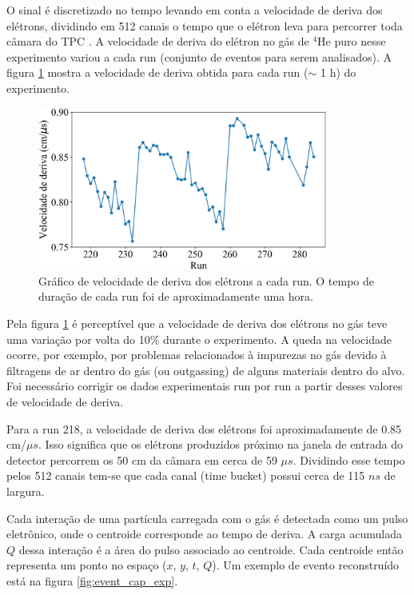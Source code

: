 \documentclass[a4paper,12pt,oneside]{book}
\begin{document}
\par O sinal é discretizado no tempo levando em conta a velocidade de deriva dos elétrons, dividindo em 512 canais o tempo que o elétron leva para percorrer toda câmara do TPC \cite{josh_bradt, pattpc}. A velocidade de deriva do elétron no gás de $^4$He puro nesse experimento variou a cada run (conjunto de eventos para serem analisados). A figura \ref{fig:vdrif_vs_run} mostra a velocidade de deriva obtida para cada run ($\sim$ 1 h) do experimento.

\begin{figure}[H]
    \centering
    \includegraphics[width=0.85\textwidth]{figs/vdrift_vs_run.png}
    \caption{Gráfico de velocidade de deriva dos elétrons a cada run. O tempo de duração de cada run foi de aproximadamente uma hora.}
    \label{fig:vdrif_vs_run}
\end{figure}

\par Pela figura \ref{fig:vdrif_vs_run} é perceptível que a velocidade de deriva dos elétrons no gás teve uma variação por volta do 10\% durante o experimento. A queda na velocidade ocorre, por exemplo, por problemas relacionados à impurezas no gás devido à filtragens de ar dentro do gás (ou outgassing) de alguns materiais dentro do alvo. Foi necessário corrigir os dados experimentais run por run a partir desses valores de velocidade de deriva.

\par Para a run 218, a velocidade de deriva dos elétrons foi aproximadamente de 0.85 cm/$\mu s$. Isso significa que os elétrons produzidos próximo na janela de entrada do detector percorrem os 50 cm da câmara em cerca de 59 $\mu s$. Dividindo esse tempo pelos 512 canais tem-se que cada canal (time bucket) possui cerca de 115 $ns$ de largura.

\par Cada interação de uma partícula carregada com o gás é detectada como um pulso eletrônico, onde o centroide corresponde ao tempo de deriva. A carga acumulada $Q$ dessa interação é a área do pulso associado ao centroide. Cada centroide então representa um ponto no espaço ($x$, $y$, $t$, $Q$). Um exemplo de evento reconstruído está na figura \ref{fig:event_cap_exp}.
\end{document}
